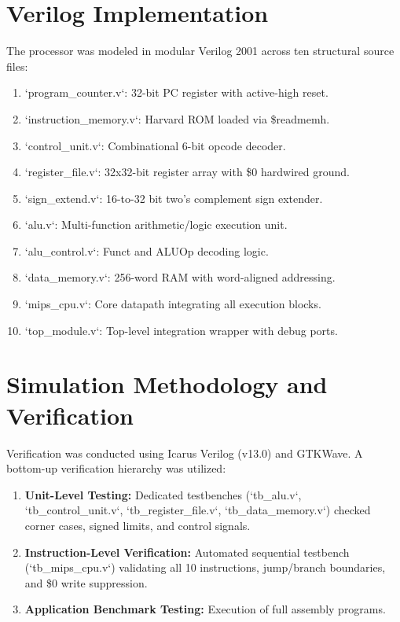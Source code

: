 \documentclass[conference]{IEEEtran}
\begin{document}
\section{Verilog Implementation}
The processor was modeled in modular Verilog 2001 across ten structural source files:
\begin{enumerate}
    \item `program_counter.v`: 32-bit PC register with active-high reset.
    \item `instruction_memory.v`: Harvard ROM loaded via \$readmemh.
    \item `control_unit.v`: Combinational 6-bit opcode decoder.
    \item `register_file.v`: 32x32-bit register array with \$0 hardwired ground.
    \item `sign_extend.v`: 16-to-32 bit two's complement sign extender.
    \item `alu.v`: Multi-function arithmetic/logic execution unit.
    \item `alu_control.v`: Funct and ALUOp decoding logic.
    \item `data_memory.v`: 256-word RAM with word-aligned addressing.
    \item `mips_cpu.v`: Core datapath integrating all execution blocks.
    \item `top_module.v`: Top-level integration wrapper with debug ports.
\end{enumerate}

\section{Simulation Methodology and Verification}
Verification was conducted using Icarus Verilog (v13.0) and GTKWave. A bottom-up verification hierarchy was utilized:
\begin{enumerate}
    \item \textbf{Unit-Level Testing:} Dedicated testbenches (`tb_alu.v`, `tb_control_unit.v`, `tb_register_file.v`, `tb_data_memory.v`) checked corner cases, signed limits, and control signals.
    \item \textbf{Instruction-Level Verification:} Automated sequential testbench (`tb_mips_cpu.v`) validating all 10 instructions, jump/branch boundaries, and \$0 write suppression.
    \item \textbf{Application Benchmark Testing:} Execution of full assembly programs.
\end{enumerate}
\end{document}

